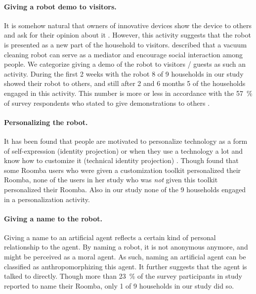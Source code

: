 \documentclass{frontiersSCNS} %
\begin{document}
\paragraph*{Giving a robot demo to visitors.} It is somehow natural that owners
of innovative devices show the device to others and ask for their opinion about
it \citep{rogers_diffusion_1995}. However, this activity suggests that the robot
is presented as a new part of the household to visitors.
\cite{sung_domestic_2010} described that a vacuum cleaning robot can serve as a
mediator and encourage social interaction among people. We categorize giving a
demo of the robot to visitors / guests as such an activity. During the first 2
weeks with the robot 8 of 9 households in our study showed their robot to
others, and still after 2 and 6 months 5 of the households engaged in this
activity. This number is more or less in accordance with the 57~\% of survey
respondents who stated to give demonstrations to others
\citep{sung_housewives_2008}.


\paragraph*{Personalizing the robot.} It has been found that people are
motivated to personalize technology as a form of self-expression (identity
projection) or when they use a technology a lot and know how to customize it
(technical identity projection) \citep{blom_personalization:_2000}. Though
\cite{sung_pimp_2009} found that some Roomba users who were given a
customization toolkit personalized their Roomba, none of the users in her study
who was \textit{not} given this toolkit personalized their Roomba. Also in our
study none of the 9 households engaged in a personalization activity.

\paragraph*{Giving a name to the robot.} Giving a name to an artificial agent
reflects a certain kind of personal relationship to the agent. By naming a
robot, it is not anonymous anymore, and might be perceived as a moral agent. As
such, naming an artificial agent can be classified as anthropomorphizing this
agent. It further suggests that the agent is talked to directly. Though more
than 23~\% of the survey participants in \cite{sung_housewives_2008} study
reported to name their Roomba, only 1 of 9 households in our study did so. 
\end{document}
